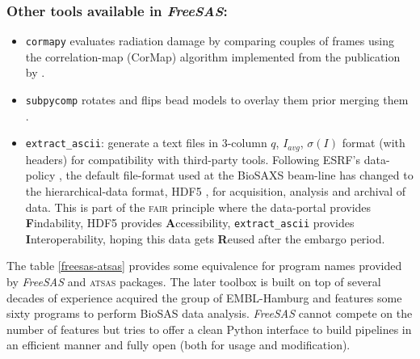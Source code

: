 \documentclass[preprint]{iucr}              %
\begin{document}
\subsubsection{Other tools available in \textit{FreeSAS}:}
\begin{itemize}
    \item \texttt{cormapy} evaluates radiation damage by comparing couples of frames using the correlation-map (CorMap) algorithm implemented from the publication by .
    \item \texttt{subpycomp} rotates and flips  bead models to overlay them prior merging them \cite{BM29ODA}.
    \item \texttt{extract\_ascii}: generate a text files in 3-column $q$, $I_{avg}$, $\sigma(I)$ format (with headers) for compatibility with third-party tools. Following ESRF's data-policy \cite{data-policy}, the default file-format used at the BioSAXS beam-line has changed to the hierarchical-data format, HDF5 \cite{hdf5}, for acquisition, analysis and archival of data. This is part of the \textsc{fair} principle \cite{FAIR} where the data-portal \cite{data-portal} provides  \textbf{F}indability, HDF5 provides \textbf{A}ccessibility, \texttt{extract\_ascii} provides  \textbf{I}nteroperability, hoping this data gets \textbf{R}eused after the embargo period.
\end{itemize}

The table \ref{freesas-atsas} provides some equivalence for program names provided by \textit{FreeSAS} and \textsc{atsas} packages.
The later toolbox is built on top of several decades of experience acquired the group of EMBL-Hamburg and features some sixty programs to perform BioSAS data analysis.
\textit{FreeSAS} cannot compete on the number of features but tries to offer a clean Python interface to build pipelines in an efficient manner and fully open (both for usage and modification).
\end{document}
